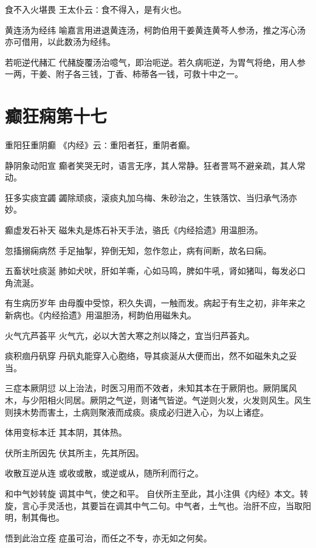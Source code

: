 \documentclass[a4paper,12pt,UTF8,twoside]{ctexbook}
\begin{document}
    食不入火堪畏
    王太仆云∶食不得入，是有火也。
    
    黄连汤为经纬
    喻嘉言用进退黄连汤，柯韵伯用干姜黄连黄芩人参汤，推之泻心汤亦可借用，以此数汤为经纬。
    
    若呃逆代赭汇
    代赭旋覆汤治噫气，即治呃逆。若久病呃逆，为胃气将绝，用人参一两，干姜、附子各三钱，丁香、柿蒂各一钱，可救十中之一。
    
    
    
    \chapter{癫狂痫第十七}
        
    重阳狂重阴癫
    《内经》云∶重阳者狂，重阴者癫。
    
    静阴象动阳宣
    癫者笑哭无时，语言无序，其人常静。狂者詈骂不避亲疏，其人常动。
    
    狂多实痰宜蠲
    蠲除顽痰，滚痰丸加乌梅、朱砂治之，生铁落饮、当归承气汤亦妙。
    
    癫虚发石补天
    磁朱丸是炼石补天手法，骆氏《内经拾遗》用温胆汤。
    
    忽搐搦痫病然
    手足抽掣，猝倒无知，忽作忽止，病有间断，故名曰痫。
    
    五畜状吐痰涎
    肺如犬吠，肝如羊嘶，心如马鸣，脾如牛吼，肾如猪叫，每发必口角流涎。
    
    有生病历岁年
    由母腹中受惊，积久失调，一触而发。病起于有生之初，非年来之新病也。《内经拾遗》用温胆汤，柯韵伯用磁朱丸。
    
    火气亢芦荟平
    火气亢，必以大苦大寒之剂以降之，宜当归芦荟丸。
    
    痰积痼丹矾穿
    丹矾丸能穿入心胞络，导其痰涎从大便而出，然不如磁朱丸之妥当。
    
    三症本厥阴愆
    以上治法，时医习用而不效者，未知其本在于厥阴也。厥阴属风木，与少阳相火同居。厥阴之气逆，则诸气皆逆。气逆则火发，火发则风生。风生则挟木势而害土，土病则聚液而成痰。痰成必归迸入心，为以上诸症。
    
    体用变标本迁
    其本阴，其体热。
    
    伏所主所因先
    伏其所主，先其所因。
    
    收散互逆从连
    或收或散，或逆或从，随所利而行之。
    
    和中气妙转旋
    调其中气，使之和平。
    自伏所主至此，其小注俱《内经》本文。转旋，言心手灵活也，其要旨在调其中气二句。中气者，土气也。治肝不应，当取阳明，制其侮也。
    
    悟到此治立痊
    症虽可治，而任之不专，亦无如之何矣。
    
\end{document}
